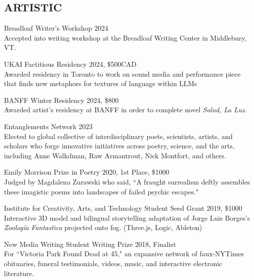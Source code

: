  \subsection{ARTISTIC}
 Breadloaf Writer's Workshop 2024\\
 Accepted into writing workshop at the Breadloaf Writing Center in Middlebury, VT. 
 
UKAI Factitious Residency 2024, \$500CAD\\
Awarded residency in Toronto to work on sound media and performance piece that finds new metaphors for textures of language within LLMs
 
BANFF Winter Residency 2024, \$800\\
Awarded artist's residency at BANFF in order to complete novel \emph{Salud, La Luz}.
 
Entanglements Network 2023 \\
 Elected to global collective of interdisciplinary poets, scientists, artists, and scholars who forge innovative initiatives across poetry, science, and the arts, including Anne Walkdman, Raw Armantrout, Nick Montfort, and others. 
 

Emily Morrison Prize in Poetry 2020, 1st Place,  \$1000  \\
Judged by Magdalena Zurawski who said, ``A fraught surrealism deftly assembles these imagistic poems into landscapes of failed psychic escapes."
 
 Institute for Creativity, Arts, and Technology Student Seed Grant 2019, \$1000  \\
Interactive 3D model and bilingual storytelling adaptation of Jorge Luis Borges's \emph{Zoolog\'ia Fantastica} projected onto fog. (Three.js, Logic, Ableton)

New Media Writing Student Writing Prize 2018, Finalist\\
For ``Victoria Park Found Dead at 45," an expansive network of faux-NYTimes obituaries, funeral testimonials, videos, music, and interactive electronic literature. 


%

